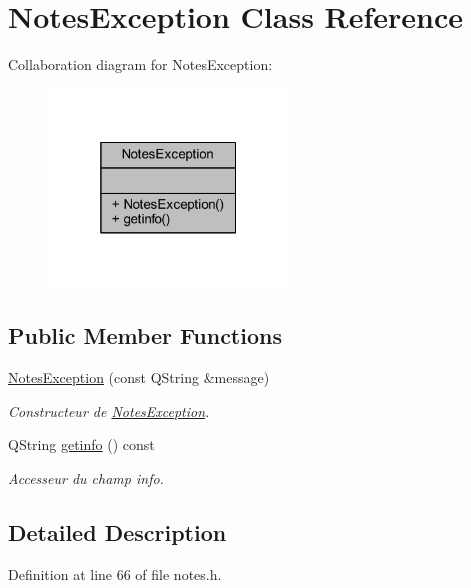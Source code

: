 \hypertarget{class_notes_exception}{}\section{Notes\+Exception Class Reference}
\label{class_notes_exception}


Collaboration diagram for Notes\+Exception\+:\nopagebreak
\begin{figure}[H]
\begin{center}
\leavevmode
\includegraphics[width=181pt]{class_notes_exception__coll__graph}
\end{center}
\end{figure}
\subsection*{Public Member Functions}
\begin{DoxyCompactItemize}
\item 
\hyperlink{class_notes_exception_af10aca61d1cb993b62e868f0fe9bf144}{Notes\+Exception} (const Q\+String \&message)
\begin{DoxyCompactList}\small\item\em Constructeur de \hyperlink{class_notes_exception}{Notes\+Exception}. \end{DoxyCompactList}\item 
Q\+String \hyperlink{class_notes_exception_a3c595994b69172290b548fdac074248d}{getinfo} () const
\begin{DoxyCompactList}\small\item\em Accesseur du champ info. \end{DoxyCompactList}\end{DoxyCompactItemize}


\subsection{Detailed Description}


Definition at line 66 of file notes.\+h.



